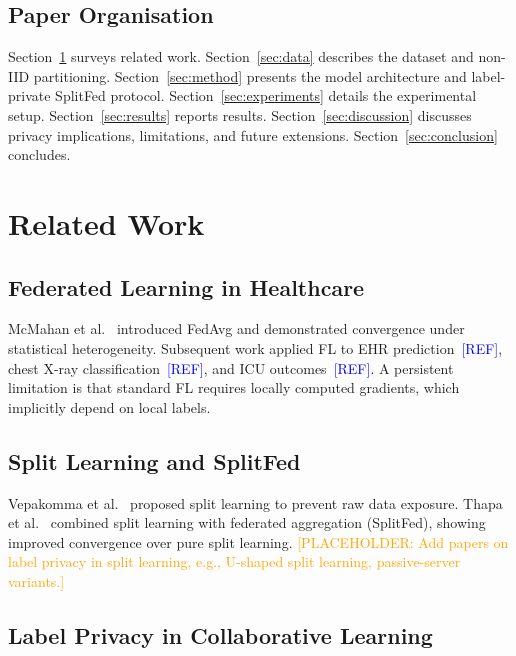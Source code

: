 \documentclass[10pt,twocolumn]{article}
\newcommand{\placeholder}[1]{\textcolor{orange}{[PLACEHOLDER: #1]}}
\newcommand{\refneeded}{\textcolor{blue}{[REF]}}
\begin{document}
\subsection{Paper Organisation}

Section~\ref{sec:related} surveys related work.
Section~\ref{sec:data} describes the dataset and non-IID partitioning.
Section~\ref{sec:method} presents the model architecture and
label-private SplitFed protocol.
Section~\ref{sec:experiments} details the experimental setup.
Section~\ref{sec:results} reports results.
Section~\ref{sec:discussion} discusses privacy implications,
limitations, and future extensions.
Section~\ref{sec:conclusion} concludes.

\section{Related Work}
\label{sec:related}

\subsection{Federated Learning in Healthcare}

McMahan et al.~\cite{mcmahan2017} introduced FedAvg and demonstrated
convergence under statistical heterogeneity.  Subsequent work applied
FL to EHR prediction~\refneeded, chest X-ray
classification~\refneeded, and ICU outcomes~\refneeded.  A persistent
limitation is that standard FL requires locally computed gradients,
which implicitly depend on local labels.

\subsection{Split Learning and SplitFed}

Vepakomma et al.~\cite{vepakomma2018} proposed split learning to
prevent raw data exposure.  Thapa et al.~\cite{thapa2022} combined
split learning with federated aggregation (SplitFed), showing improved
convergence over pure split learning.
\placeholder{Add papers on label privacy in split learning, e.g.,
U-shaped split learning, passive-server variants.}

\subsection{Label Privacy in Collaborative Learning}
\end{document}
